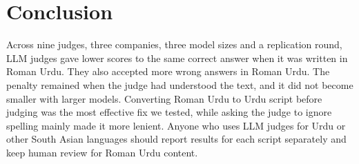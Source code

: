 \documentclass[conference]{IEEEtran}
\begin{document}
\section{Conclusion}
Across nine judges, three companies, three model sizes and a replication round, LLM judges gave lower scores to the
same correct answer when it was written in Roman Urdu. They also accepted more wrong answers in Roman Urdu. The penalty
remained when the judge had understood the text, and it did not become smaller with larger models. Converting Roman Urdu
to Urdu script before judging was the most effective fix we tested, while asking the judge to ignore spelling mainly
made it more lenient. Anyone who uses LLM judges for Urdu or other South Asian languages should report results for each
script separately and keep human review for Roman Urdu content.



\end{document}
